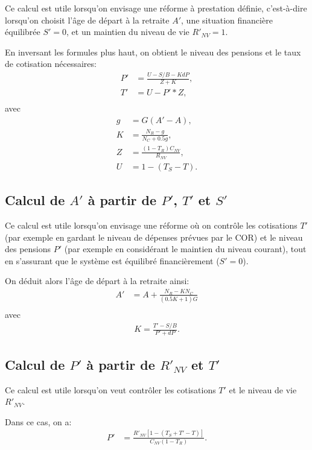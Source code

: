 \documentclass[10pt]{article}
\begin{document}
  Ce calcul est utile lorsqu'on envisage une réforme à prestation définie, c'est-à-dire lorsqu'on choisit l'âge de départ à la retraite $A'$, une situation financière équilibrée $S'=0$, et un maintien du niveau de vie $R'_{NV}=1$.

  En inversant les formules plus haut, on obtient le niveau des pensions et le taux de cotisation nécessaires:
  \begin{align}
    P' &= \frac{U-S/B-KdP}{Z+K}, \\
    T' & = U-P'*Z, \\
  \end{align}
  avec
  \begin{align}
    g & = G (A'-A), \\
    K & = \frac{N_R-g}{N_C + 0.5g}, \\
    Z & = \frac{ (1-T_R) C_{NV} }{R_{NV}}, \\
    U & = 1 - (T_S - T).
  \end{align}


\subsection{Calcul de $A'$ à partir de $P'$, $T'$ et $S'$}

  Ce calcul est utile lorsqu'on envisage une réforme où on contrôle les cotisations $T'$ (par exemple en gardant le niveau de dépenses prévues par le COR) et le niveau des pensions $P'$ (par exemple en considérant le maintien du niveau courant), tout en s'assurant que le système est équilibré financièrement ($S'=0$).

On déduit alors l'âge de départ à la retraite ainsi:
\begin{align}
     A' & = A + \frac{N_R - K N_C}{(0.5K+1)G}  \\
  \end{align}
  avec
  \begin{align}
    K = \frac{T'-S/B}{P'+dP}.
  \end{align}

  
  
  \subsection{Calcul de $P'$ à partir de $R'_{NV}$ et $T'$}

  Ce calcul est utile lorsqu'on veut contrôler les cotisations $T'$ et le niveau de vie $R'_{NV}$.

  Dans ce cas, on a:
  \begin{align}
    P' &= \frac{R'_{NV}[1-(T_S+T'-T)]}{C_{NV}(1-T_R)}. \\
  \end{align}
\end{document}
